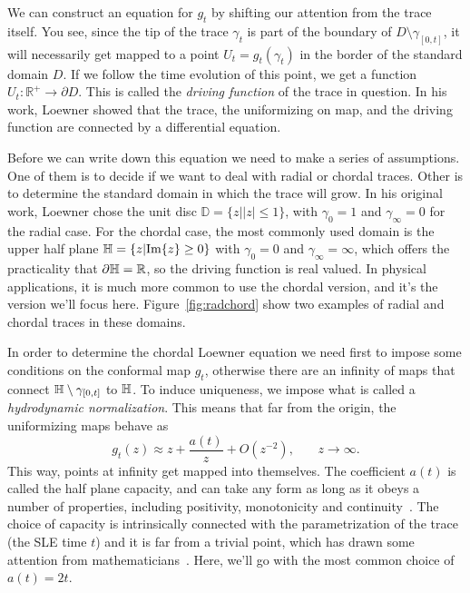 We can construct an equation for $g_t$ by shifting our attention from the trace
itself. You see, since the tip of the trace $\gamma_t$ is part of the boundary
of $D\setminus\gamma_{[0,t]}$, it will necessarily get mapped to a point
$U_t=g_t(\gamma_t)$ in the border of the standard domain $D$. If we follow the
time evolution of this point, we get a function
$U_t:\mathbb{R}^+\rightarrow\partial D$. This is called the \textit{driving
function} of the trace in question. In his work, Loewner showed that the
trace, the uniformizing on map, and the driving function are connected by a
differential equation.

Before we can write down this equation we need to make a series of assumptions.
One of them is to decide if we want to deal with radial or chordal traces.
Other is to determine the standard domain in which the trace will grow. In his
original work, Loewner chose the unit disc $\mathbb{D}=\{z||z|\leq1\}$, with
$\gamma_0=1$ and $\gamma_\infty=0$ for the radial case. For the chordal case,
the most commonly used domain is the upper half plane
$\mathbb{H}=\{z|\mbox{Im}\{z\}\geq0\}$ with $\gamma_0=0$ and $\gamma_\infty=\infty$,
which offers the practicality that $\partial\mathbb{H}=\mathbb{R}$, so the driving
function is real valued. In physical applications, it is much more common to
use the chordal version, and it's the version we'll focus here.
Figure~\ref{fig:radchord} show two examples of radial and chordal traces in
these domains.

In order to determine the chordal Loewner equation we need first to impose some
conditions on the conformal map $g_t$, otherwise there are an infinity
of maps that connect $\mathbb{H}\setminus\gamma_{[0,t]}$ to $\mathbb{H}$. To induce
uniqueness, we impose what is called a \textit{hydrodynamic normalization}.
This means that far from the origin, the uniformizing maps behave as
\begin{equation}
    \label{eq:hydro}
    g_{t}\left(z\right)\approx
    z+\frac{a\left(t\right)}{z}+O\left(z^{-2}\right)
    ,\,\,\,\,\,\,\,\,\,\,\,
    z\rightarrow\infty.
\end{equation}
This way, points at infinity get mapped into themselves. The coefficient $a(t)$
is called the half plane capacity, and can take any form as long as it obeys a
number of properties, including positivity, monotonicity and
continuity~\cite{Kager2004}. The choice of capacity is intrinsically connected
with the parametrization of the trace (the SLE time $t$) and it is far from a
trivial point, which has drawn some attention from
mathematicians~\cite{Lawler2011}. Here, we'll go with the most common choice of
$a(t)=2t$.

